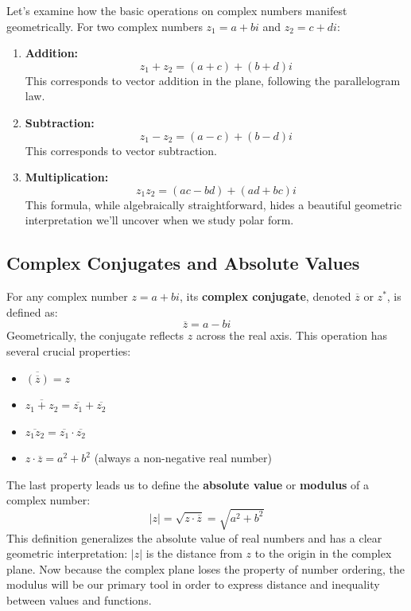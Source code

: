 \noindent Let's examine how the basic operations on complex numbers manifest geometrically. For two complex numbers $z_1 = a + bi$ and $z_2 = c + di$:

\begin{enumerate}
    \item \textbf{Addition:} 
    \[
    z_1 + z_2 = (a + c) + (b + d)i
    \]
    This corresponds to vector addition in the plane, following the parallelogram law.
    
    \item \textbf{Subtraction:}
    \[
    z_1 - z_2 = (a - c) + (b - d)i
    \]
    This corresponds to vector subtraction.
    
    \item \textbf{Multiplication:}
    \[
    z_1z_2 = (ac - bd) + (ad + bc)i
    \]
    This formula, while algebraically straightforward, hides a beautiful geometric interpretation we'll uncover when we study polar form.
\end{enumerate}

\subsection*{Complex Conjugates and Absolute Values}  
\noindent For any complex number $z = a + bi$, its \textbf{complex conjugate}, denoted $\overline{z}$ or $z^*$, is defined as:
\[
\overline{z} = a - bi
\]
\noindent Geometrically, the conjugate reflects $z$ across the real axis. This operation has several crucial properties:
\begin{itemize}
\item $\overline{(\overline{z})} = z$
\item $\overline{z_1 + z_2} = \overline{z_1} + \overline{z_2}$
\item $\overline{z_1z_2} = \overline{z_1}\cdot\overline{z_2}$
\item $z\cdot\overline{z} = a^2 + b^2$ (always a non-negative real number)
\end{itemize}
\noindent The last property leads us to define the \textbf{absolute value} or \textbf{modulus} of a complex number:
\[
|z| = \sqrt{z\cdot\overline{z}} = \sqrt{a^2 + b^2}
\]
\noindent This definition generalizes the absolute value of real numbers and has a clear geometric interpretation: $|z|$ is the distance from $z$ to the origin in the complex plane. Now because the complex plane loses the property of number ordering, the modulus will be our primary tool in order to express distance and inequality between values and functions. \\

